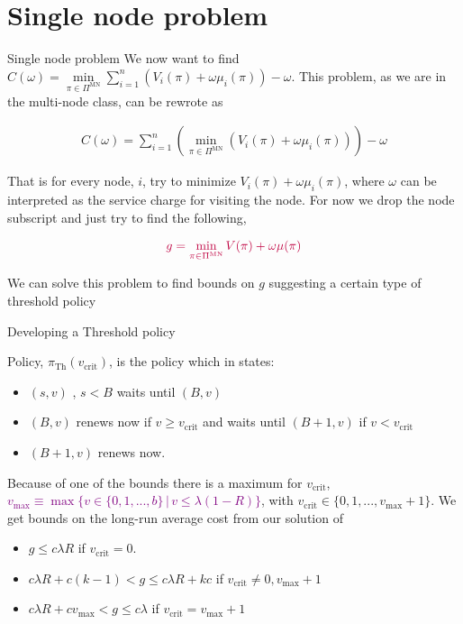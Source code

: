 \documentclass[10pt]{beamer}
\begin{document}
\section{Single node problem}
\begin{frame}{Single node problem}
We now want to find $C(\omega)=\min\limits_{\pi \in \Pi^{\text{MN}}} \sum\limits_{i=1}^{n} (V_{i}(\pi)+\omega \mu_{i}(\pi)) - \omega$. This problem, as we are in the multi-node class, can be rewrote as

\begin{align*}
C(\omega)=\sum\limits_{i=1}^{n} \left(\min\limits_{\pi \in \Pi^{\text{MN}}} \left(V_{i}(\pi)+\omega \mu_{i}(\pi)\right)\right) - \omega
\end{align*}

\pause
That is for every node, $i$, try to minimize $V_{i}(\pi)+\omega \mu_{i}(\pi)$, where $\omega$ can be interpreted as the service charge for visiting the node. For now we drop the node subscript and just try to find the following,

\begin{align*}
\textcolor{purple}{g=\min_{\pi \in \Pi^{\text{MN}}} V(\pi) + \omega \mu(\pi)}
\end{align*}

\pause
We can solve this problem to find bounds on $g$ suggesting a certain type of threshold policy

\end{frame}

\begin{frame}{Developing a Threshold policy}
\begin{definition}
Policy, $\pi_{\text{Th}}(v_{\text{crit}})$, is the policy which in states:
\begin{itemize}
\item $(s,v)$ , $s < B$ waits until $(B,v)$
\item $(B,v)$ renews now if $v \geq v_{\text{crit}}$ and waits until $(B+1,v)$ if $v < v_{\text{crit}}$
\item $(B+1,v)$ renews now.
\end{itemize}
\end{definition}
\pause
Because of one of the bounds there is a maximum for $v_{\text{crit}}$, \textcolor{purple}{$v_{\text{max}} \equiv \max \{ v \in \{0,1,...,b \} \, | \, v \leq \lambda (1-R) \} $}, with $v_{\text{crit}} \in \{0,1,...,v_{\text{max}}+1 \}$.
\pause
We get bounds on the long-run average cost from our solution of
\begin{itemize}
\item $g \leq c \lambda R$ if $v_{\text{crit}}=0$.

\item $c \lambda R +c(k-1) < g \leq c \lambda R + kc$ if $v_{\text{crit}} \neq 0,v_{\text{max}}+1$

\item $c \lambda R + c v_{\text{max}} < g \leq c \lambda$ if $v_{\text{crit}}=v_{\text{max}}+1$
\end{itemize}

\end{frame}
\end{document}
